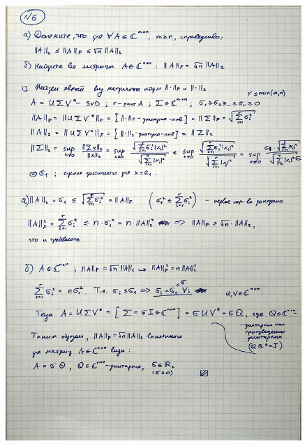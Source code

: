 \documentclass{article}
\begin{document}
		\begin{figure}[h!]
			\includegraphics[width=0.95\linewidth]{handwritten/matcomp_hw1_6}
		\end{figure}
		
\end{document}

